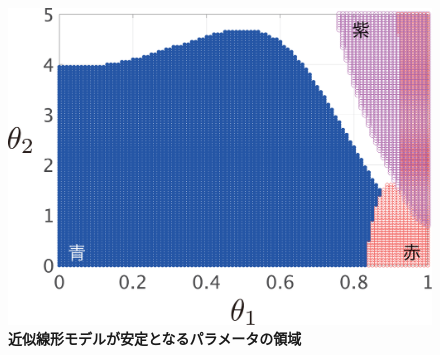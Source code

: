 \documentclass[tombow,dvipdfmx]{corona-a5-1.1}
\begin{document}
\begin{figure}[t!]
{\begin{minipage}{0.49\linewidth}
    \medskip
  \end{minipage}
  \begin{minipage}{0.49\linewidth}
    \centering
    \includegraphics[width = 0.90\linewidth]{figs/Y0.01D0.01X}
    \medskip
  \end{minipage}
}
 \caption{\textbf{近似線形モデルが安定となるパラメータの領域}}
 \label{fig:stacheckX}
\medskip
\end{figure}

\end{document}
